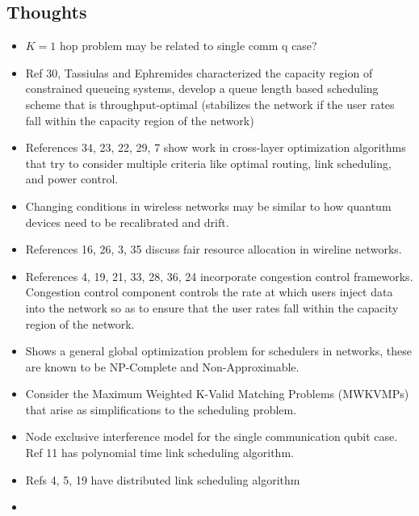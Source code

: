 \documentclass{article}
\begin{document}
\subsection{Thoughts}
\begin{itemize}
    \item $K=1$ hop problem may be related to single comm q case?
    \item Ref 30, Tassiulas and Ephremides characterized the capacity region of constrained queueing systems, develop a queue length based scheduling scheme that is throughput-optimal (stabilizes the network if the user rates fall within the capacity region of the network)
    \item References 34, 23, 22, 29, 7 show work in cross-layer optimization algorithms that try to consider multiple criteria like optimal routing, link scheduling, and power control.
    \item Changing conditions in wireless networks may be similar to how quantum devices need to be recalibrated and drift.
    \item References 16, 26, 3, 35 discuss fair resource allocation in wireline networks.
    \item References 4, 19, 21, 33, 28, 36, 24 incorporate congestion control frameworks.  Congestion control component controls the rate at which users inject data into the network so as to ensure that the user rates fall within the capacity region of the network.
    \item Shows a general global optimization problem for schedulers in networks, these are known to be NP-Complete and Non-Approximable.
    \item Consider the Maximum Weighted K-Valid Matching Problems (MWKVMPs) that arise as simplifications to the scheduling problem.
    \item Node exclusive interference model for the single communication qubit case.  Ref 11 has polynomial time link scheduling algorithm.
    \item Refs 4, 5, 19 have distributed link scheduling algorithm
    \item
\end{itemize}
\end{document}
